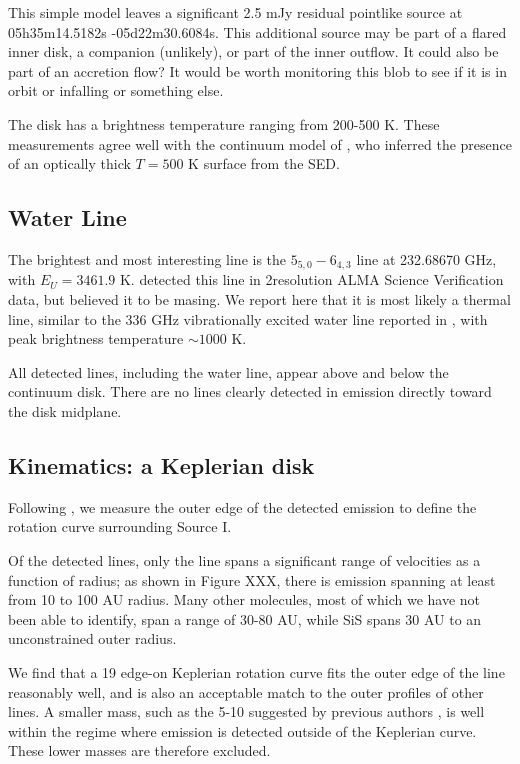 \documentclass[twocolumn]{aastex61}
\begin{document}
This simple model leaves a significant 2.5 mJy residual pointlike source at 
05h35m14.5182s -05d22m30.6084s.  This additional source may be part of a flared
inner disk, a companion (unlikely), or part of the inner outflow.  It could
also be part of an accretion flow?  It would be worth monitoring this blob
to see if it is in orbit or infalling or something else.

The disk has a brightness temperature ranging from 200-500 K.  These measurements
agree well with the continuum model of \citet{Plambeck2016a}, who inferred
the presence of an optically thick $T=500$ K surface from the SED.

\subsection{Water Line}
The brightest and most interesting line is the \water $5_{5,0}-6_{4,3}$ line at
232.68670 GHz, with $E_U=3461.9$ K.  \citet{Hirota2012a} detected this line
in 2\arcsec resolution ALMA Science Verification data, but believed it to be masing.
We report here that it is most likely a thermal line, similar to the 336 GHz vibrationally
excited water line reported in \citet{Hirota2014a}, with peak brightness
temperature $\sim1000$ K.

All detected lines, including the water line, appear above and below the
continuum disk.  There are no lines clearly detected in emission directly
toward the disk midplane.

\subsection{Kinematics: a Keplerian disk}
Following \citet{Seifried2016a}, we measure the outer edge of the detected
emission to define the rotation curve surrounding Source I.

Of the detected lines, only the \water line spans a significant range of velocities
as a function of radius; as shown in Figure XXX, there is \water emission
spanning at least from 10 to 100 AU radius.  Many other molecules, most of
which we have not been able to identify, span a range of 30-80 AU, while SiS
spans 30 AU to an unconstrained outer radius.

We find that a 19 \msun edge-on Keplerian rotation curve fits the outer edge
of the \water line reasonably well, and is also an acceptable match to
the outer profiles of other lines.  A smaller mass, such as the 5-10 \msun
suggested by previous authors \citep{}, is well within the regime where emission
is detected outside of the Keplerian curve.  These lower masses are therefore
excluded.
\end{document}
